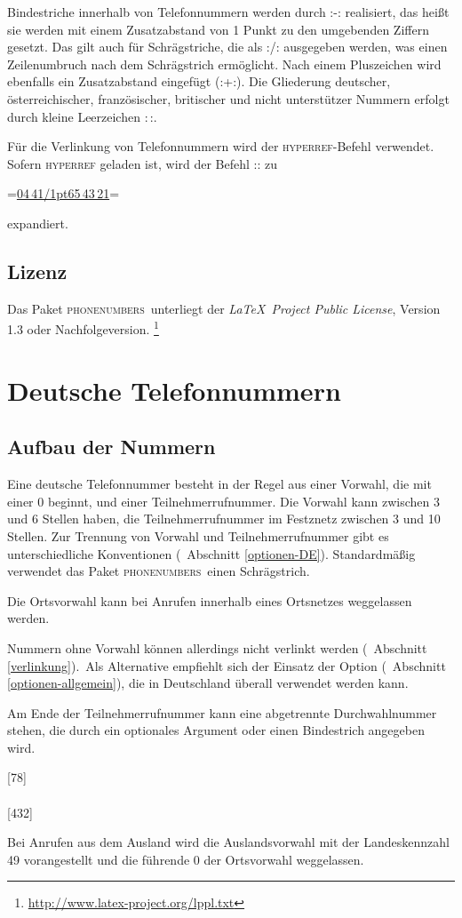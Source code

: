 \documentclass[numbers=noenddot]{scrreprt}
\newcommand\Abschnittsliteratur[1]{\bgroup
\small
\raggedright
\printbibliography[heading=subbibnumbered,keyword=#1]
\egroup}
\newcommand*\Paket[1]{\textsc{#1}}
\newcommand\phone{\textcolor{cnltx}{\Paket{phone\-numbers}}}
\newcommand\UeberschriftAufbau{\section{Aufbau der Nummern}}
\newcommand\KeineVerlinkung{Nummern ohne Vorwahl können allerdings nicht verlinkt werden
\vglAbschnitt{verlinkung}.}
\newcommand*\vglAbschnitt[1]{(\cf\ Abschnitt \ref{#1})}
\newcommand*\AufbauDEATA[6]{Eine #1 Telefonnummer besteht in der Regel aus einer Vorwahl, die mit einer 0 beginnt, und einer Teilnehmerrufnummer. Die Vorwahl kann zwischen #2 und #3 Stellen haben, die Teilnehmerrufnummer im Festznetz zwischen #4 und #5 Stellen. Zur Trennung von Vorwahl und Teilnehmerrufnummer gibt es unterschiedliche Konventionen
\vglAbschnitt{#6}.
Standardmäßig verwendet das Paket \phone\ einen Schrägstrich.}
\newcommand\AufbauDEATB{Die Ortsvorwahl kann bei Anrufen innerhalb eines Ortsnetzes weggelassen werden.}
\newcommand\AufbauDEATC[1]{\KeineVerlinkung\ Als Alternative empfiehlt sich der Einsatz der Option \option{home-area-code}
\vglAbschnitt{optionen-allgemein},
die in #1 überall verwendet werden kann.\par
Am Ende der Teilnehmerrufnummer kann eine abgetrennte Durchwahlnummer stehen, die durch ein optionales Argument oder einen Bindestrich angegeben wird.}
\newcommand*\AufbauDEATD[1]{Bei Anrufen aus dem Ausland wird die Auslandsvorwahl mit der Landeskennzahl #1 vorangestellt und die führende 0 der Ortsvorwahl weggelassen.}
\begin{document}
Bindestriche innerhalb von Telefonnummern werden durch
\verbcode:\kern1pt-\kern1pt: realisiert, das heißt sie werden mit einem Zusatzabstand von 1 Punkt zu den umgebenden Ziffern gesetzt. Das gilt auch für Schrägstriche, die als
\verbcode:\kern1pt\slash\kern1pt: ausgegeben werden, was einen Zeilenumbruch nach dem Schrägstrich ermöglicht. Nach einem Pluszeichen wird ebenfalls ein Zusatzabstand eingefügt
(\verbcode:+\kern1pt:).
Die Gliederung deutscher, österreichischer, französischer, britischer und nicht unterstützer Nummern erfolgt durch kleine Leerzeichen
\verbcode:\,:.

Für die Verlinkung von Telefonnummern wird der \Paket{hyperref}-Befehl  verwendet. Sofern \Paket{hyperref} geladen ist, wird der Befehl
\verbcode::
zu
\begin{center}
\verbcode=\href{tel:+49441654321}{04\,41\kern1pt\slash\kern1pt65\,43\,21}=
\end{center}
expandiert.

\section{Lizenz}
Das Paket \phone\ unterliegt der
\emph{\LaTeX\ Project Public License},
Version 1.3 oder Nachfolgeversion.%
\footnote{\url{http://www.latex-project.org/lppl.txt}}

\Abschnittsliteratur{general}

\chapter{Deutsche Telefonnummern}
\UeberschriftAufbau
\AufbauDEATA{deutsche}{3}{6}{3}{10}{optionen-DE}
\begin{sidebyside}
\end{sidebyside}

\AufbauDEATB
\begin{sidebyside}
\end{sidebyside}
\AufbauDEATC{Deutschland}
\begin{sidebyside}
  [78] \\
   \\
  [432] \\
\end{sidebyside}

\AufbauDEATD{49}
\begin{sidebyside}
\end{sidebyside}
\end{document}
